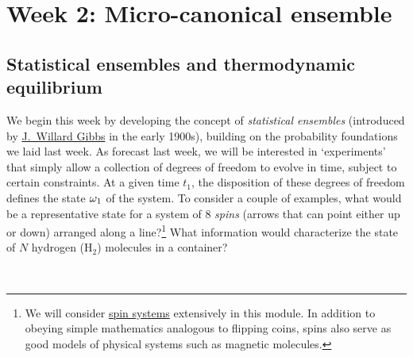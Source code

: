 \renewcommand{\thisweek}{MATH327 Week 2}
\renewcommand{\moddate}{Last modified 4 Feb.~2021}
\setcounter{section}{2}
\setcounter{subsection}{0}
{}
\section*{Week 2: Micro-canonical ensemble}

\subsection{Statistical ensembles and thermodynamic equilibrium}
We begin this week by developing the concept of \textit{statistical ensembles} (introduced by \href{https://en.wikipedia.org/wiki/Josiah_Willard_Gibbs}{J.\ Willard Gibbs} in the early 1900s), building on the probability foundations we laid last week.
As forecast last week, we will be interested in `experiments' that simply allow a collection of degrees of freedom to evolve in time, subject to certain constraints.
At a given time $t_1$, the disposition of these degrees of freedom defines the state $\omega_1$ of the system.
To consider a couple of examples, what would be a representative state for a system of $8$ \textit{spins} (arrows that can point either up or down) arranged along a line?\footnote{We will consider \href{https://en.wikipedia.org/wiki/Spin_model}{spin systems} extensively in this module.  In addition to obeying simple mathematics analogous to flipping coins, spins also serve as good models of physical systems such as magnetic molecules.}
What information would characterize the state of $N$ hydrogen (H$_2$) molecules in a container?
\begin{mdframed}
  \ \\[100 pt]
\end{mdframed}

